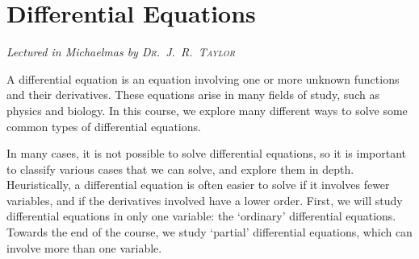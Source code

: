 \chapter[Differential Equations \\ \textnormal{\emph{Lectured in Michaelmas \oldstylenums{2020} by \textsc{Dr.\ J.\ R.\ Taylor}}}]{Differential Equations}
\emph{\Large Lectured in Michaelmas  by \textsc{Dr.\ J.\ R.\ Taylor}}

A differential equation is an equation involving one or more unknown functions and their derivatives.
These equations arise in many fields of study, such as physics and biology.
In this course, we explore many different ways to solve some common types of differential equations.

In many cases, it is not possible to solve differential equations, so it is important to classify various cases that we can solve, and explore them in depth.
Heuristically, a differential equation is often easier to solve if it involves fewer variables, and if the derivatives involved have a lower order.
First, we will study differential equations in only one variable: the `ordinary' differential equations.
Towards the end of the course, we study `partial' differential equations, which can involve more than one variable.


